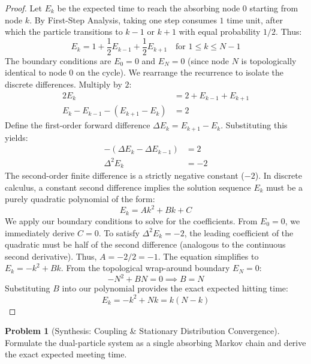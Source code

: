 \documentclass[11pt, a4paper]{article}
\theoremstyle{definition}
\newtheorem{problem}{Problem}
\theoremstyle{plain}
\begin{document}
\begin{proof}
Let $E_k$ be the expected time to reach the absorbing node $0$ starting from node $k$. By First-Step Analysis, taking one step consumes $1$ time unit, after which the particle transitions to $k-1$ or $k+1$ with equal probability $1/2$. Thus:
\[
E_k = 1 + \frac{1}{2}E_{k-1} + \frac{1}{2}E_{k+1} \quad \text{for } 1 \le k \le N-1
\]
The boundary conditions are $E_0 = 0$ and $E_N = 0$ (since node $N$ is topologically identical to node $0$ on the cycle).
We rearrange the recurrence to isolate the discrete differences. Multiply by $2$:
\begin{align*}
2E_k &= 2 + E_{k-1} + E_{k+1} \\
E_k - E_{k-1} - (E_{k+1} - E_k) &= 2
\end{align*}
Define the first-order forward difference $\Delta E_k = E_{k+1} - E_k$. Substituting this yields:
\begin{align*}
- (\Delta E_k - \Delta E_{k-1}) &= 2 \\
\Delta^2 E_k &= -2
\end{align*}
The second-order finite difference is a strictly negative constant ($-2$). In discrete calculus, a constant second difference implies the solution sequence $E_k$ must be a purely quadratic polynomial of the form:
\[
E_k = Ak^2 + Bk + C
\]
We apply our boundary conditions to solve for the coefficients. 
From $E_0 = 0$, we immediately derive $C = 0$.
To satisfy $\Delta^2 E_k = -2$, the leading coefficient of the quadratic must be half of the second difference (analogous to the continuous second derivative). Thus, $A = -2 / 2 = -1$. The equation simplifies to $E_k = -k^2 + Bk$.
From the topological wrap-around boundary $E_N = 0$:
\[
-N^2 + BN = 0 \implies B = N
\]
Substituting $B$ into our polynomial provides the exact expected hitting time:
\[
E_k = -k^2 + Nk = k(N - k)
\]
\end{proof}

\vspace{0.5cm}

\begin{problem}[Synthesis: Coupling \& Stationary Distribution Convergence]
Formulate the dual-particle system as a single absorbing Markov chain and derive the exact expected meeting time.
\end{problem}
\end{document}
